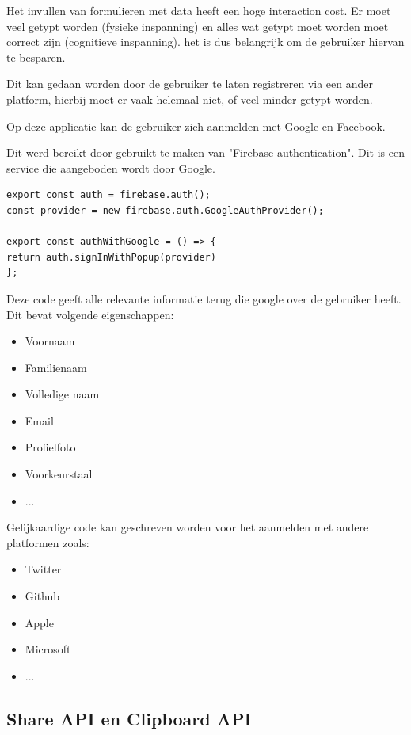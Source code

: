 		Het invullen van formulieren met data heeft een hoge interaction cost. Er moet veel getypt worden (fysieke inspanning) en alles wat getypt moet worden moet correct zijn (cognitieve inspanning). het is dus belangrijk om de gebruiker hiervan te besparen.
		
		Dit kan gedaan worden door de gebruiker te laten registreren via een ander platform, hierbij moet er vaak helemaal niet, of veel minder getypt worden.
		
		Op deze applicatie kan de gebruiker zich aanmelden met Google en Facebook.
		
		Dit werd bereikt door gebruikt te maken van "Firebase authentication". Dit is een service die aangeboden wordt door Google.
		
		
\begin{lstlisting}
export const auth = firebase.auth();
const provider = new firebase.auth.GoogleAuthProvider();

export const authWithGoogle = () => {
return auth.signInWithPopup(provider)
};
\end{lstlisting}
	
		Deze code geeft alle relevante informatie terug die google over de gebruiker heeft. Dit bevat volgende eigenschappen:
		\begin{itemize}
			\item Voornaam
			\item Familienaam
			\item Volledige naam
			\item Email
			\item Profielfoto
			\item Voorkeurstaal
			\item ...
		\end{itemize} 
		
		Gelijkaardige code kan geschreven worden voor het aanmelden met andere platformen zoals:
		\begin{itemize}
			\item Twitter
			\item Github
			\item Apple
			\item Microsoft
			\item ...
		\end{itemize} 
		
	\subsection{Share API en Clipboard API}
	
